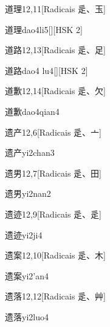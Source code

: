 \begin{entry}{道理}{12,11}[Radicais ⾡、⽟]
  \begin{phonetics}{道理}{dao4li5}[][HSK 2]
  \end{phonetics}
\end{entry}

\begin{entry}{道路}{12,13}[Radicais ⾡、⾜]
  \begin{phonetics}{道路}{dao4 lu4}[][HSK 2]
  \end{phonetics}
\end{entry}

\begin{entry}{道歉}{12,14}[Radicais ⾡、⽋]
  \begin{phonetics}{道歉}{dao4qian4}
  \end{phonetics}
\end{entry}

\begin{entry}{遗产}{12,6}[Radicais ⾡、⼇]
  \begin{phonetics}{遗产}{yi2chan3}
  \end{phonetics}
\end{entry}

\begin{entry}{遗男}{12,7}[Radicais ⾡、⽥]
  \begin{phonetics}{遗男}{yi2nan2}
  \end{phonetics}
\end{entry}

\begin{entry}{遗迹}{12,9}[Radicais ⾡、⾡]
  \begin{phonetics}{遗迹}{yi2ji4}
  \end{phonetics}
\end{entry}

\begin{entry}{遗案}{12,10}[Radicais ⾡、⽊]
  \begin{phonetics}{遗案}{yi2'an4}
  \end{phonetics}
\end{entry}

\begin{entry}{遗落}{12,12}[Radicais ⾡、⾋]
  \begin{phonetics}{遗落}{yi2luo4}
  \end{phonetics}
\end{entry}

